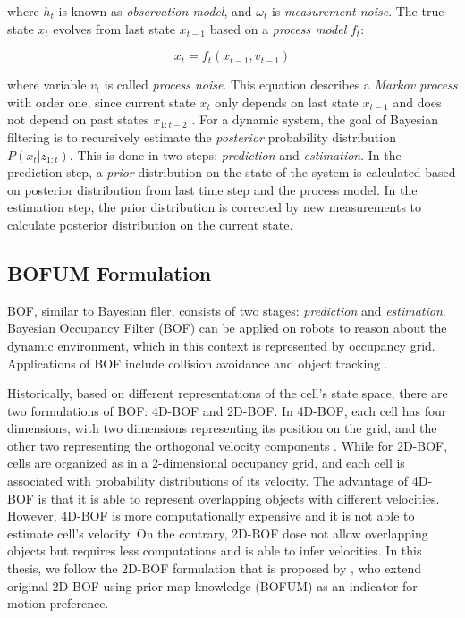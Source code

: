 where $h_t$ is known as \textit{observation model}, and $\omega_t$ is \textit{measurement noise}. The true state $x_t$ evolves from last state $x_{t-1}$ based on a \textit{process model} $f_t$:

\begin{equation}
x_t = f_t(x_{t-1}, v_{t-1})
\end{equation}

where variable $v_{t}$ is called \textit{process noise}. This equation describes a \textit{Markov process} with order one, since current state $x_t$ only depends on last state $x_{t-1}$ and does not depend on past states $x_{1:t-2}$ . For a dynamic system, the goal of Bayesian filtering is to recursively estimate the \textit{posterior} probability distribution $P(x_t|z_{1:t})$. This is done in two steps: \textit{prediction} and \textit{estimation}. In the prediction step, a \textit{prior} distribution on the state of the system is calculated based on posterior distribution from last time step and the process model. In the estimation step, the prior distribution is corrected by new measurements to calculate posterior distribution on the current state.

\subsection{BOFUM Formulation} \label{sec:bof}

BOF, similar to Bayesian filer, consists of two stages: \textit{prediction} and \textit{estimation}. Bayesian Occupancy Filter (BOF) can be applied on robots to reason about the dynamic environment, which in this context is represented by occupancy grid. Applications of BOF include collision avoidance \citep{coue2006bayesian} and object tracking \citep{chen2006dynamic}.

Historically, based on different representations of the cell's state space, there are two formulations of BOF: 4D-BOF and 2D-BOF. In 4D-BOF, each cell has four dimensions, with two dimensions representing its position on the grid, and the other two representing the orthogonal velocity components \citep{coue2006bayesian}. While for 2D-BOF, cells are organized as in a 2-dimensional occupancy grid, and each cell is associated with probability distributions of its velocity. The advantage of 4D-BOF is that it is able to represent overlapping objects with different velocities. However, 4D-BOF is more computationally expensive and it is not able to estimate cell's velocity. On the contrary, 2D-BOF dose not allow overlapping objects but requires less computations and is able to infer velocities. In this thesis, we follow the 2D-BOF formulation that is proposed by \citet{gindele2009bayesian}, who extend original 2D-BOF using prior map knowledge (BOFUM) as an indicator for motion preference. 			

